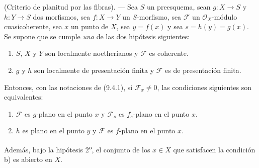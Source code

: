 \begin{theorem}[11.3.10]
\label{IV.11.3.10}
(Criterio de planitud por las fibras). --- Sea $S$ un preesquema, sean $g:X\to S$ y $h:Y\to S$ dos morfismos, sea $f:X\to Y$ un $S$-morfismo, sea $\mathcal F$ un $\mathcal O_X$-módulo cuasicoherente, sea $x$ un punto de $X$, sea $y=f(x)$ y sea $s=h(y)=g(x)$. Se supone que se cumple \emph{una} de las dos hipótesis siguientes:
\begin{enumerate}[label=\textup{\arabic{enumi}\textsuperscript{o}}]
  \item $S$, $X$ y $Y$ son localmente noetherianos y $\mathcal F$ es coherente.
  \item $g$ y $h$ son localmente de presentación finita y $\mathcal F$ es de presentación finita.
\end{enumerate}
Entonces, con las notaciones de (9.4.1), si $\mathcal F_x\neq0$, las condiciones siguientes son equivalentes:
\begin{enumerate}[label=\emph{\alph*)}]
  \item $\mathcal F$ es $g$-plano en el punto $x$ y $\mathcal F_s$ es $f_s$-plano en el punto $x$.
  \item $h$ es plano en el punto $y$ y $\mathcal F$ es $f$-plano en el punto $x$.
\end{enumerate}
Además, bajo la hipótesis \textup{2\textsuperscript{o}}, el conjunto de los $x\in X$ que satisfacen la condición \textup{b)} es abierto en $X$.
\end{theorem}

